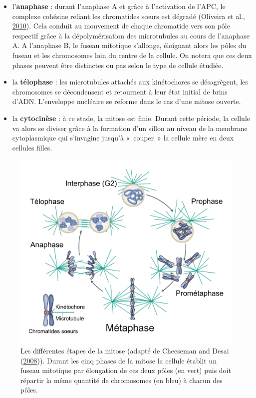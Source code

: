 \documentclass[12pt,a4paper,twoside,openright]{book}
\begin{document}
\begin{itemize}
\item
  l'\textbf{anaphase} : durant l'anaphase A et grâce à l'activation de
  l'APC, le complexe cohésine reliant les chromatides sœurs est dégradé
  (Oliveira et al., \protect\hyperlink{ref-Oliveira2010}{2010}). Cela
  conduit au mouvement de chaque chromatide vers son pôle respectif
  grâce à la dépolymérisation des microtubules au cours de l'anaphase A.
  A l'anaphase B, le fuseau mitotique s'allonge, éloignant alors les
  pôles du fuseau et les chromosomes loin du centre de la cellule. On
  notera que ces deux phases peuvent être distinctes ou pas selon le
  type de cellule étudiée.
\item
  la \textbf{télophase} : les microtubules attachés aux kinétochores se
  désagrègent, les chromosomes se décondensent et retournent à leur état
  initial de brins d'ADN. L'enveloppe nucléaire se reforme dans le cas
  d'une mitose ouverte.
\item
  la \textbf{cytocinèse} : à ce stade, la mitose est finie. Durant cette
  période, la cellule va alors se diviser grâce à la formation d'un
  sillon au niveau de la membrane cytoplasmique qui s'invagine jusqu'à
  «~couper~» la cellule mère en deux cellules filles.
\end{itemize}

\begin{figure}[htbp]
\centering
\includegraphics{figures/intro/mitosis.png}
\caption{\label{fig:mitosis}Les différentes étapes de la mitose (adapté
de Cheeseman and Desai (\protect\hyperlink{ref-Cheeseman2008}{2008})).
Durant les cinq phases de la mitose la cellule établit un fuseau
mitotique par élongation de ces deux pôles (en vert) puis doit répartir
la même quantité de chromosomes (en bleu) à chacun des pôles.}
\end{figure}
\end{document}
